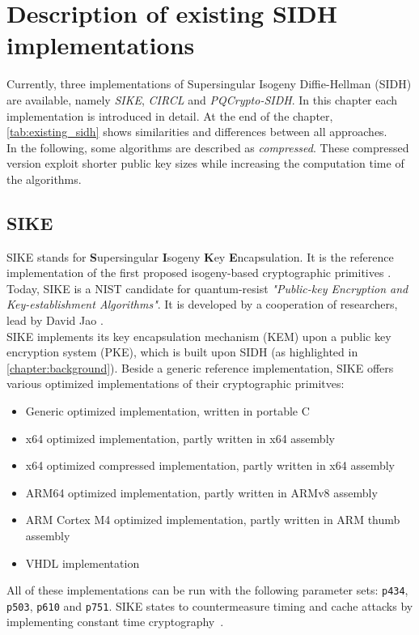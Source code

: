 \chapter{Description of existing SIDH implementations}\label{chapter:existing_sidh}
Currently, three implementations of Supersingular Isogeny Diffie-Hellman (SIDH) are available, namely \textit{SIKE}, \textit{CIRCL} and \textit{PQCrypto-SIDH}. In this chapter each implementation is introduced in detail. At the end of the chapter, \autoref{tab:existing_sidh} shows similarities and differences between all approaches.
\\
In the following, some algorithms are described as \textit{compressed}. These compressed version exploit shorter public key sizes while increasing the computation time of the algorithms.

\section{SIKE}
SIKE stands for \textbf{S}upersingular \textbf{I}sogeny \textbf{K}ey \textbf{E}ncapsulation. It is the reference implementation of the first proposed isogeny-based cryptographic primitives \parencite{jao2011towards}. Today, SIKE is a NIST candidate for quantum-resist \textit{"Public-key Encryption and Key-establishment Algorithms"}. It is developed by a cooperation of researchers, lead by David Jao \parencite{sike2020spec}.
\\
SIKE implements its key encapsulation mechanism (KEM) upon a public key encryption system (PKE), which is built upon SIDH (as highlighted in \autoref{chapter:background}). Beside a generic reference implementation, SIKE offers various optimized implementations of their cryptographic primitves:
\begin{itemize}
  \item Generic optimized implementation, written in portable C
  \item x64 optimized implementation, partly written in x64 assembly
  \item x64 optimized compressed implementation, partly written in x64 assembly
  \item ARM64 optimized implementation, partly written in ARMv8 assembly
  \item ARM Cortex M4 optimized implementation, partly written in ARM thumb assembly
  \item VHDL implementation
\end{itemize}
All of these implementations can be run with the following parameter sets: \texttt{p434}, \texttt{p503}, \texttt{p610} and \texttt{p751}. SIKE states to countermeasure timing and cache attacks by implementing constant time cryptography~\parencite{sike2020spec}.


